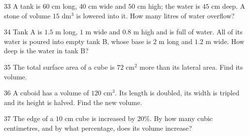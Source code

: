 \gap
\begin{probbox}{33}{}
A tank is $60$ cm long, $40$ cm wide and $50$ cm high; the water is $45$ cm deep. A stone of volume $15$ dm$^3$ is lowered into it. How many litres of water overflow?
\end{probbox}
\gap
\begin{probbox}{34}{}
Tank A is $1.5$ m long, $1$ m wide and $0.8$ m high and is full of water. All of its water is poured into empty tank B, whose base is $2$ m long and $1.2$ m wide. How deep is the water in tank B?
\end{probbox}
\gap
\begin{probbox}{35}{}
The total surface area of a cube is $72$ cm$^2$ more than its lateral area. Find its volume.
\end{probbox}
\gap
\begin{probbox}{36}{}
A cuboid has a volume of $120$ cm$^3$. Its length is doubled, its width is tripled and its height is halved. Find the new volume.
\end{probbox}
\gap
\begin{probbox}{37}{}
The edge of a $10$ cm cube is increased by $20\%$. By how many cubic centimetres, and by what percentage, does its volume increase?
\end{probbox}
